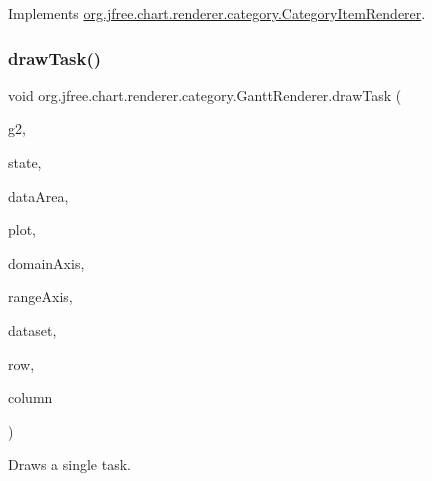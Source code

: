 Implements \mbox{\hyperlink{interfaceorg_1_1jfree_1_1chart_1_1renderer_1_1category_1_1_category_item_renderer_ac18a046a47d2b991ab2c968ce3363aea}{org.\+jfree.\+chart.\+renderer.\+category.\+Category\+Item\+Renderer}}.

\mbox{\label{classorg_1_1jfree_1_1chart_1_1renderer_1_1category_1_1_gantt_renderer_a062d75694f2433a19441441b8dcec3ea}} 
\subsubsection{\texorpdfstring{draw\+Task()}{drawTask()}}
{\footnotesize\ttfamily void org.\+jfree.\+chart.\+renderer.\+category.\+Gantt\+Renderer.\+draw\+Task (\begin{DoxyParamCaption}\item[{Graphics2D}]{g2,  }\item[{\mbox{\hyperlink{classorg_1_1jfree_1_1chart_1_1renderer_1_1category_1_1_category_item_renderer_state}{Category\+Item\+Renderer\+State}}}]{state,  }\item[{Rectangle2D}]{data\+Area,  }\item[{\mbox{\hyperlink{classorg_1_1jfree_1_1chart_1_1plot_1_1_category_plot}{Category\+Plot}}}]{plot,  }\item[{\mbox{\hyperlink{classorg_1_1jfree_1_1chart_1_1axis_1_1_category_axis}{Category\+Axis}}}]{domain\+Axis,  }\item[{\mbox{\hyperlink{classorg_1_1jfree_1_1chart_1_1axis_1_1_value_axis}{Value\+Axis}}}]{range\+Axis,  }\item[{\mbox{\hyperlink{interfaceorg_1_1jfree_1_1data_1_1gantt_1_1_gantt_category_dataset}{Gantt\+Category\+Dataset}}}]{dataset,  }\item[{int}]{row,  }\item[{int}]{column }\end{DoxyParamCaption})\hspace{0.3cm}{\ttfamily [protected]}}

Draws a single task.


